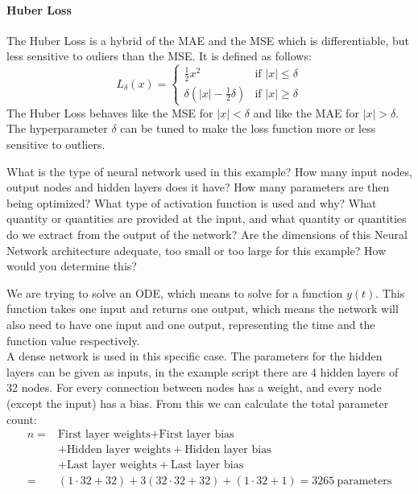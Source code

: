 \documentclass[we,twoside,openright,a4paper,11pt]{uantwerpenbamathesis}
\begin{document}
\paragraph{Huber Loss} The Huber Loss is a hybrid of the MAE and the MSE which is differentiable, but less sensitive to ouliers than the MSE. It is defined as follows:
\begin{equation}\label{eq:huber_loss}
    L_{\delta}(x) = \begin{cases}
        \frac{1}{2}x^2 & \text{if } |x| \leq \delta \\
        \delta\left(|x| - \frac{1}{2}\delta\right) & \text{if } |x| \geq \delta
    \end{cases}
\end{equation}
The Huber Loss behaves like the MSE for $|x|<\delta$ and like the MAE for $|x|>\delta$. The hyperparameter $\delta$ can be tuned to make the loss function more or less sensitive to outliers.

\begin{tcolorbox}[title=Question 4, colback=blue!10!white, colframe=blue!40!white, sharp corners]
    What is the type of neural network used in this example? How many input nodes, output nodes and hidden layers does it have? How many parameters are then being optimized? What type of activation function is used and why? What quantity or quantities are provided at the input, and what quantity or quantities do we extract from the output of the network? Are the dimensions of this Neural Network architecture adequate, too small or too large for this example? How would you determine this?
\end{tcolorbox}

We are trying to solve an ODE, which means to solve for a function $y(t)$. This function takes one input and returns one output, which means the network will also need to have one input and one output, representing the time and the function value respectively.\\

A dense network is used in this specific case. The parameters for the hidden layers can be given as inputs, in the example script there are 4 hidden layers of 32 nodes. For every connection between nodes has a weight, and every node (except the input) has a bias. From this we can calculate the total parameter count:
\begin{equation}
\begin{split}
n ={}& \text{First layer weights} + \text{First layer bias} \\
     &+ \text{Hidden layer weights} + \text{Hidden layer bias} \\
     &+ \text{Last layer weights} + \text{Last layer bias} \\
     ={}&(1\cdot32 + 32) + 3(32\cdot32+32) + (1\cdot32 + 1)=3265\ \text{parameters} 
\end{split}
\end{equation}
\end{document}
